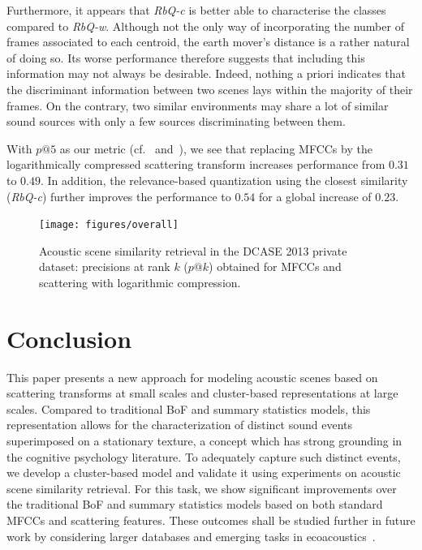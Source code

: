 \documentclass[smallextended]{svjour3}
\begin{document}
Furthermore, it appears that \emph{RbQ-c} is better able to characterise the classes compared to \emph{RbQ-w}. Although not the only way of incorporating the number of frames associated to each centroid, the earth mover's distance is a rather natural of doing so. Its worse performance therefore suggests that including this information may not always be desirable. Indeed, nothing a priori indicates that the discriminant information between two scenes lays within the majority of their frames. On the contrary, two similar environments may share a lot of similar sound sources with only a few sources discriminating between them.

With $p@5$ as our metric (cf.~\cite{aucouturier2007bag} and~\cite{lagrange:hal-01082501}), we see that replacing MFCCs by the logarithmically compressed scattering transform increases performance from $0.31$ to $0.49$. In addition, the relevance-based quantization using the closest similarity (\emph{RbQ-c}) further improves the performance to $0.54$ for a global increase of $0.23$.

\begin{figure}[t]
\begin{center}
\texttt{[image: figures/overall]}
\caption{Acoustic scene similarity retrieval in the DCASE 2013 private dataset: precisions at rank $k$ ($p@k$) obtained for MFCCs and scattering with logarithmic compression.}
\label{fig:ASS_1}
\end{center}
\end{figure}

\section{Conclusion}

This paper presents a new approach for modeling acoustic scenes based on scattering transforms at small scales and cluster-based representations at large scales. Compared to traditional BoF and summary statistics models, this representation allows for the characterization of distinct sound events superimposed on a stationary texture, a concept which has strong grounding in the cognitive psychology literature. To adequately capture such distinct events, we develop a cluster-based model and validate it using experiments on acoustic scene similarity retrieval. For this task, we show significant improvements over the traditional BoF and summary statistics models based on both standard MFCCs and scattering features.
These outcomes shall be studied further in future work by considering larger databases and emerging tasks in ecoacoustics~\cite{sueur2015ecoacoustics, wimmer2013sampling}.
\end{document}
